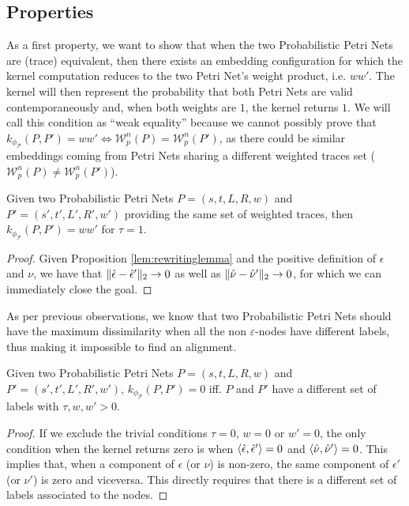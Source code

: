 \subsection{Properties}
As a first property, we want to show that when the two Probabilistic Petri Nets are (trace) equivalent, then there exists an embedding configuration for which the kernel computation reduces to the two Petri Net's weight product, i.e. $ww'$. The kernel will then represent the probability that both Petri Nets are valid contemporaneously and, when both weights are $1$, the kernel returns $1$. We will call this condition as ``weak equality'' because we cannot possibly prove that $k_{\phi_{\mathcal{P}}}(P,P')=ww'\Leftrightarrow \mathcal{W}_p^n(P)=\mathcal{W}_p^n(P')$, as there could be similar embeddings coming from Petri Nets sharing a different weighted traces set ($\mathcal{W}_p^n(P)\neq\mathcal{W}_p^n(P')$).

\begin{lemma}
Given two Probabilistic Petri Nets $P=(s,t,L,R,w)$ and $P'=(s',t',L',R',w')$ providing the same set of weighted traces, then $k_{\phi_{\mathcal{P}}}(P,P')=ww'$ for $\tau=1$.
\end{lemma}
\begin{proof}
Given Proposition \ref{lem:rewritinglemma} and the positive definition of $\epsilon$ and $\nu$,  we have that $\|\hat{\epsilon}-\hat{\epsilon}'\|_{2}\to 0$ as well as $\|\hat{\nu}-\hat{\nu}'\|_{2}\to 0$, for which we can immediately close the goal.
\end{proof}

As per previous observations, we know that two Probabilistic Petri Nets should have the maximum dissimilarity when all the non $\varepsilon$-nodes have different labels, thus making it impossible to find an alignment. 

\begin{lemma}
Given two Probabilistic Petri Nets $P=(s,t,L,R,w)$ and $P'=(s',t',L',R',w')$, $k_{\phi_{\mathcal{P}}}(P,P')=0$ iff. $P$ and $P'$ have a different set of labels with $\tau,w,w'>0$.
\end{lemma}
\begin{proof}
If we exclude the trivial conditions $\tau=0$, $w=0$ or $w'=0$, the only condition when the kernel returns zero is when  $\Braket{\hat{\epsilon},\hat{\epsilon}'}=0$ and $\Braket{\hat{\nu},\hat{\nu}'}=0$. This implies that, when a component of $\epsilon$ (or $\nu$) is non-zero, the same component of $\epsilon'$ (or $\nu'$) is zero and viceversa. This directly requires that there is a different set of labels associated to the nodes. 
\end{proof}

